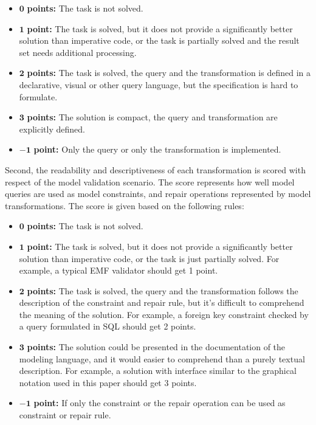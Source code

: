 \documentclass[submission,copyright,creativecommons]{eptcs}
\begin{document}
\begin{itemize}
  \item $\mathbf{0}$   \textbf{points:} The task is not solved.
  \item $\mathbf{1}$   \textbf{point:} The task is solved, but it does not provide a significantly better solution than imperative code, or the task is partially solved and the result set needs additional processing.
  \item $\mathbf{2}$   \textbf{points:} The task is solved, the query and the transformation is defined in a declarative, visual or other query language, but the specification is hard to formulate.
  \item $\mathbf{3}$   \textbf{points:} The solution is compact, the query and transformation are explicitly defined.
  \item $\mathbf{-1}$  \textbf{point:} Only the query or only the transformation is implemented.
\end{itemize}

Second, the readability and descriptiveness of each transformation is scored with respect of the model validation scenario. The score represents how well model queries are used as model constraints, and repair operations represented by model transformations. The score is given based on the following rules:
\begin{itemize}
  \item $\mathbf{0}$   \textbf{points:} The task is not solved.
  \item $\mathbf{1}$   \textbf{point:} The task is solved, but it does not provide a significantly better solution than imperative code, or the task is just partially solved. For example, a typical EMF validator should get 1 point.
  \item $\mathbf{2}$   \textbf{points:} The task is solved, the query and the transformation follows the description of the constraint and repair rule, but it's difficult to comprehend the meaning of the solution. For example, a foreign key constraint checked by a query formulated in SQL should get 2 points.
  \item $\mathbf{3}$   \textbf{points:} The solution could be presented in the documentation of the modeling language, and it would easier to comprehend than a purely textual description. For example, a solution with interface similar to the graphical notation used in this paper should get 3 points.
  \item $\mathbf{-1}$  \textbf{point:} If only the constraint or the repair operation can be used as constraint or repair rule.
\end{itemize}
\end{document}
